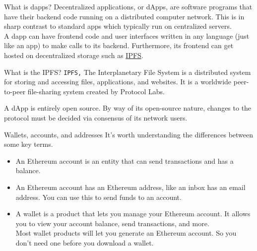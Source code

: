 \documentclass[aspectratio=169,usenames,dvipsnames,pdftex]{beamer}
\begin{document}
  \begin{frame}{What is dapps?}
    Decentralized applications, or dApps, are software programs that have their backend code running on a distributed computer network. This is in sharp contrast to standard apps which typically run on centralized servers. \\
    A dapp can have frontend code and user interfaces written in any language (just like an app) to make calls to its backend. Furthermore, its frontend can get hosted on decentralized storage such as \href{https://ipfs.io/}{IPFS}. \\[8pt]

    \begin{block}{What is the IPFS?}
      \texttt{IPFS,} The Interplanetary File System is a distributed system for storing and accessing files, applications, and websites. It is a worldwide peer-to-peer file-sharing system created by Protocol Labs.
    \end{block}

    A dApp is entirely open source. By way of its open-source nature, changes to the protocol must be decided via consensus of its network users.
  \end{frame}

  \begin{frame}{Wallets, accounts, and addresses}
    It's worth understanding the differences between some key terms.
    \begin{itemize}
      \item An Ethereum account is an entity that can send transactions and has a balance.
      \item An Ethereum account has an Ethereum address, like an inbox has an email address. You can use this to send funds to an account.
      \item A wallet is a product that lets you manage your Ethereum account. It allows you to view your account balance, send transactions, and more. \\[6pt]
        Most wallet products will let you generate an Ethereum account. So you don't need one before you download a wallet.
    \end{itemize}
  \end{frame}
\end{document}
